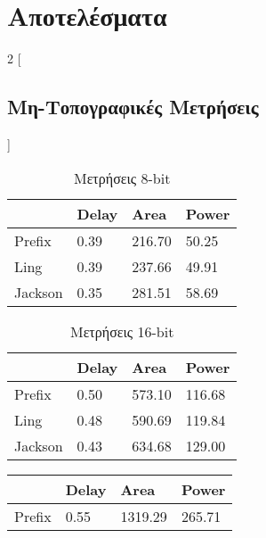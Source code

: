 \section{Αποτελέσματα}

\begin{multicols}{2}
[\subsection{Μη-Τοπογραφικές Μετρήσεις}]
\begin{table}[H]
\centering
     \begin{tabular}{||p{1.2cm} | p{0.7cm}  p{1cm}  p{1cm} ||} 
        \hline
         & Delay & Area & Power \\ [0.5ex] 
        \hline\hline
        Prefix  & 0.39  & 216.70    & 50.25 \\ 
        \hline
        Ling    & 0.39  & 237.66    & 49.91 \\
        \hline
        Jackson & 0.35  & 281.51    & 58.69 \\
        \hline
    \end{tabular}
\caption{Μετρήσεις 8-bit}
\label{result_table_8}
\end{table}
\begin{table}[H]
\centering
     \begin{tabular}{||p{1.2cm} | p{0.7cm} p{1cm} p{1cm} ||} 
        \hline
        & Delay & Area & Power \\ [0.5ex] 
        \hline\hline
        Prefix  & 0.50  & 573.10    & 116.68 \\ 
        \hline
        Ling    & 0.48  & 590.69    & 119.84 \\
        \hline
        Jackson & 0.43  & 634.68    & 129.00 \\
        \hline
    \end{tabular}
\caption{Μετρήσεις 16-bit}
\label{result_table_16}
\end{table}
\begin{table}[H]
\centering
     \begin{tabular}{||p{1.2cm} | p{0.7cm} p{1cm} p{1cm} ||} 
        \hline
        & Delay & Area & Power \\ [0.5ex] 
        \hline\hline
        Prefix  & 0.55  & 1319.29    & 265.71 \\ 

\end{tabular}
\end{table}
\end{multicols}
